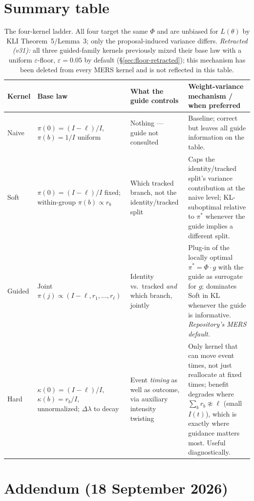 \documentclass[11pt]{article}
\theoremstyle{plain}
\begin{document}
\section{Summary table}
\label{sec:summary}

\begin{table}[h]
\centering
\small
\begin{tabular}{@{}p{1.7cm}p{3.6cm}p{4.0cm}p{4.4cm}@{}}
\toprule
Kernel & Base law & What the guide controls & Weight-variance mechanism / when preferred \\
\midrule
Naive & $\pi(0)=(I-\ell)/I$, $\pi(b)=1/I$ uniform & Nothing --- guide not consulted & Baseline;
correct but leaves all guide information on the table. \\
\addlinespace
Soft & $\pi(0)=(I-\ell)/I$ fixed; within-group $\pi(b)\propto r_b$ & Which tracked branch, not the
identity/tracked split & Caps the identity/tracked split's variance contribution at the naive level;
KL-suboptimal relative to $\pi^*$ whenever the guide implies a different split. \\
\addlinespace
Guided & Joint $\pi(j)\propto(I-\ell,r_1,\ldots,r_\ell)$ & Identity vs.\ tracked \emph{and} which
branch, jointly & Plug-in of the locally optimal $\pi^*=\Phi\cdot g$ with the guide as surrogate for
$g$; dominates Soft in KL whenever the guide is informative. \emph{Repository's MERS default.} \\
\addlinespace
Hard & $\kappa(0)=(I-\ell)/I$, $\kappa(b)=r_b/I$, unnormalized; $\Delta\lambda$ to decay & Event
\emph{timing} as well as outcome, via auxiliary intensity twisting & Only kernel that can move
event times, not just reallocate at fixed times; benefit degrades where $\sum_b r_b\not\approx\ell$
(small $I(t)$), which is exactly where guidance matters most. Useful diagnostically. \\
\bottomrule
\end{tabular}
\caption{The four-kernel ladder. All four target the same $\Phi$ and are unbiased for $L(\theta)$
by KLI Theorem~5/Lemma~3; only the proposal-induced variance differs. \emph{Retracted (v31):} all
three guided-family kernels previously mixed their base law with a uniform $\varepsilon$-floor,
$\varepsilon=0.05$ by default (\S\ref{sec:floor-retracted}); this mechanism has been deleted from
every MERS kernel and is not reflected in this table.}
\end{table}

\section*{Addendum (18 September 2026)}
\end{document}
